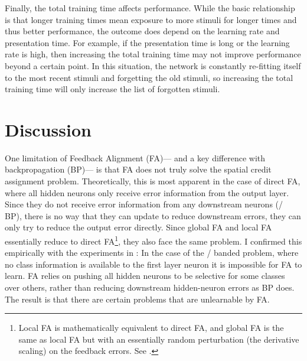 Finally, the total training time affects performance.
While the basic relationship is that longer training times
mean exposure to more stimuli for longer times and thus better performance,
the outcome does depend on the learning rate and presentation time.
For example, if the presentation time is long or the learning rate is high,
then increasing the total training time may not improve performance
beyond a certain point.
In this situation, the network is constantly re-fitting itself
to the most recent stimuli and forgetting the old stimuli,
so increasing the total training time will only
increase the list of forgotten stimuli.


\section{Discussion}

One limitation of Feedback Alignment (FA)---%
and a key difference with backpropagation (BP)---%
is that FA does not truly solve the spatial credit assignment problem.
Theoretically, this is most apparent in the case of direct FA,
where all hidden neurons only receive error information from the output layer.
Since they do not receive error information from any downstream neurons (\cf/ BP),
there is no way that they can update to reduce downstream errors,
they can only try to reduce the output error directly.
Since global FA and local FA essentially reduce to direct FA\footnote{
  Local FA is mathematically equivalent to direct FA,
  and global FA is the same as local FA
  but with an essentially random perturbation (the derivative scaling)
  on the feedback errors. See .},
they also face the same problem.
I confirmed this empirically with the experiments in :
In the case of the \dd/ banded problem,
where no class information is available to the first layer neuron
it is impossible for FA to learn.
FA relies on pushing all hidden neurons to be selective
for some classes over others,
rather than reducing downstream hidden-neuron errors as BP does.
The result is that there are certain problems that are unlearnable by FA.

